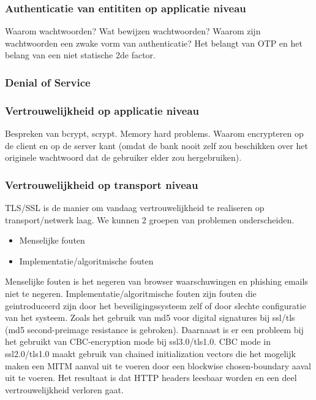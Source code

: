 \documentclass[11pt]{article}
\begin{document}
\subsubsection{Authenticatie van entititen op applicatie niveau}
Waarom wachtwoorden? Wat bewijzen wachtwoorden? Waarom zijn wachtwoorden een zwake vorm van authenticatie? Het belangt van OTP en het belang van een niet statische 2de factor.

\subsubsection{Denial of Service}

\subsubsection{Vertrouwelijkheid op applicatie niveau}
Bespreken van bcrypt, scrypt. Memory hard problems. Waarom encrypteren op de client en op de server kant (omdat de bank nooit zelf zou beschikken over het originele wachtwoord dat de gebruiker elder zou hergebruiken).

\subsubsection{Vertrouwelijkheid op transport niveau}
TLS/SSL is de manier om vandaag vertrouwelijkheid te realiseren op transport/netwerk laag. We kunnen 2 groepen van problemen onderscheiden.

\begin{itemize}
\item Menselijke fouten
\item Implementatie/algoritmische fouten
\end{itemize}

Menselijke fouten is het negeren van browser waarschuwingen en phishing emails niet te negeren.
Implementatie/algoritmische fouten zijn fouten die geintroduceerd zijn door het beveiligingssysteem zelf of door slechte configuratie van het systeem. Zoals het gebruik van md5 voor digital signatures bij ssl/tls (md5 second-preimage resistance is gebroken).
Daarnaast is er een probleem bij het gebruikt van CBC-encryption mode bij ssl3.0/tls1.0. CBC mode in ssl2.0/tls1.0 maakt gebruik van chained initialization vectors die het mogelijk maken een MITM aanval uit te voeren door een blockwise chosen-boundary aaval uit te voeren. Het resultaat is dat HTTP headers leesbaar worden en een deel vertrouwelijkheid verloren gaat. \\
\end{document}
